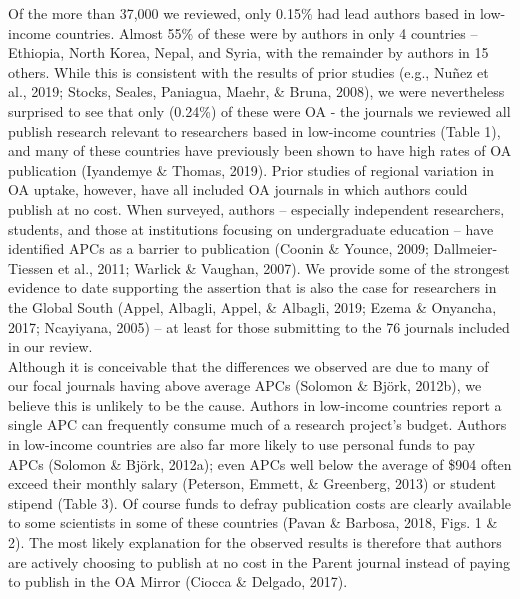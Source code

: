 \documentclass[
  english,
  man]{apa6}
\begin{document}
Of the more than 37,000 we reviewed, only 0.15\% had lead authors based in low-income countries. Almost 55\% of these were by authors in only 4 countries -- Ethiopia, North Korea, Nepal, and Syria, with the remainder by authors in 15 others. While this is consistent with the results of prior studies (e.g., Nuñez et al., 2019; Stocks, Seales, Paniagua, Maehr, \& Bruna, 2008), we were nevertheless surprised to see that only (0.24\%) of these were OA - the journals we reviewed all publish research relevant to researchers based in low-income countries (Table 1), and many of these countries have previously been shown to have high rates of OA publication (Iyandemye \& Thomas, 2019). Prior studies of regional variation in OA uptake, however, have all included OA journals in which authors could publish at no cost. When surveyed, authors -- especially independent researchers, students, and those at institutions focusing on undergraduate education -- have identified APCs as a barrier to publication (Coonin \& Younce, 2009; Dallmeier-Tiessen et al., 2011; Warlick \& Vaughan, 2007). We provide some of the strongest evidence to date supporting the assertion that is also the case for researchers in the Global South (Appel, Albagli, Appel, \& Albagli, 2019; Ezema \& Onyancha, 2017; Ncayiyana, 2005) -- at least for those submitting to the 76 journals included in our review.\\
Although it is conceivable that the differences we observed are due to many of our focal journals having above average APCs (Solomon \& Björk, 2012b), we believe this is unlikely to be the cause. Authors in low-income countries report a single APC can frequently consume much of a research project's budget. Authors in low-income countries are also far more likely to use personal funds to pay APCs (Solomon \& Björk, 2012a); even APCs well below the average of \$904 often exceed their monthly salary (Peterson, Emmett, \& Greenberg, 2013) or student stipend (Table 3). Of course funds to defray publication costs are clearly available to some scientists in some of these countries (Pavan \& Barbosa, 2018, Figs. 1 \& 2). The most likely explanation for the observed results is therefore that authors are actively choosing to publish at no cost in the Parent journal instead of paying to publish in the OA Mirror (Ciocca \& Delgado, 2017).\\
\end{document}

